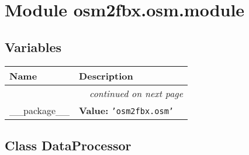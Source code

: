 %
%
%


\section{Module osm2fbx.osm.module}

    \label{osm2fbx:osm:module}


  \subsection{Variables}

    \vspace{-1cm}
\hspace{\varindent}\begin{longtable}{|p{\varnamewidth}|p{\vardescrwidth}|l}
\cline{1-2}
\cline{1-2} \centering \textbf{Name} & \centering \textbf{Description}& \\
\cline{1-2}
\endhead\cline{1-2}\multicolumn{3}{r}{\small\textit{continued on next page}}\\\endfoot\cline{1-2}
\endlastfoot\raggedright \_\-\_\-p\-a\-c\-k\-a\-g\-e\-\_\-\_\- & \raggedright \textbf{Value:} 
{\tt \texttt{'}\texttt{osm2fbx.osm}\texttt{'}}&\\
\cline{1-2}
\end{longtable}



\subsection{Class DataProcessor}


